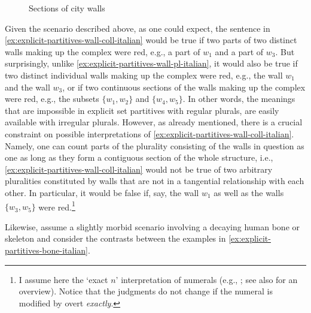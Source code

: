 \begin{figure}[h]
\centering
{}
\caption{Sections of city walls}
\label{fig:city-walls}
\end{figure}

Given the scenario described above, as one could expect, the sentence in \ref{ex:explicit-partitives-wall-coll-italian} would be true if two parts of two distinct walls making up the complex were red, e.g., a part of $w_1$ and a part of $w_3$. But surprisingly, unlike \ref{ex:explicit-partitives-wall-pl-italian}, it would also be true if two distinct individual walls making up the complex were red, e.g., the wall $w_1$ and the wall $w_3$, or if two continuous sections of the walls making up the complex were red, e.g., the subsets $\{w_1, w_2\}$ and $\{w_4, w_5\}$. In other words, the meanings that are impossible in explicit set partitives with regular plurals, are easily available with irregular plurals. However, as already mentioned, there is a crucial constraint on possible interpretations of \ref{ex:explicit-partitives-wall-coll-italian}. Namely, one can count parts of the plurality consisting of the walls in question as one as long as they form a contiguous section of the whole structure, i.e., \ref{ex:explicit-partitives-wall-coll-italian} would not be true of two arbitrary pluralities constituted by walls that are not in a tangential relationship with each other. In particular, it would be false if, say, the wall $w_1$ as well as the walls $\{w_3, w_5\}$ were red.\footnote{I assume here the `exact $n$' interpretation of numerals (e.g., \citealt{horn1992said,geurts1998scalars,breheny2005some}; see also \citealt{geurts2006take} for an overview). Notice that the judgments do not change if the numeral is modified by overt \textit{exactly}.}\largerpage[2]

Likewise, assume a slightly morbid scenario involving a decaying human bone or skeleton and consider the contrasts between the examples in \ref{ex:explicit-partitives-bone-italian}.  

